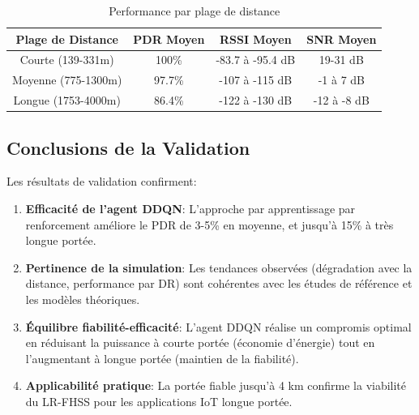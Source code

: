 \begin{table}[h]
\centering
\small
\begin{tabular}{|c|c|c|c|}
\hline
\textbf{Plage de Distance} & \textbf{PDR Moyen} & \textbf{RSSI Moyen} & \textbf{SNR Moyen} \\
\hline
Courte (139-331m) & 100\% & -83.7 à -95.4 dB & 19-31 dB \\
\hline
Moyenne (775-1300m) & 97.7\% & -107 à -115 dB & -1 à 7 dB \\
\hline
Longue (1753-4000m) & 86.4\% & -122 à -130 dB & -12 à -8 dB \\
\hline
\end{tabular}
\caption{Performance par plage de distance}
\label{tab:distance_performance}
\end{table}

\subsection{Conclusions de la Validation}

Les résultats de validation confirment:

\begin{enumerate}
    \item \textbf{Efficacité de l'agent DDQN}: L'approche par apprentissage par renforcement améliore le PDR de 3-5\% en moyenne, et jusqu'à 15\% à très longue portée.
    
    \item \textbf{Pertinence de la simulation}: Les tendances observées (dégradation avec la distance, performance par DR) sont cohérentes avec les études de référence et les modèles théoriques.
    
    \item \textbf{Équilibre fiabilité-efficacité}: L'agent DDQN réalise un compromis optimal en réduisant la puissance à courte portée (économie d'énergie) tout en l'augmentant à longue portée (maintien de la fiabilité).
    
    \item \textbf{Applicabilité pratique}: La portée fiable jusqu'à 4 km confirme la viabilité du LR-FHSS pour les applications IoT longue portée.
\end{enumerate}
